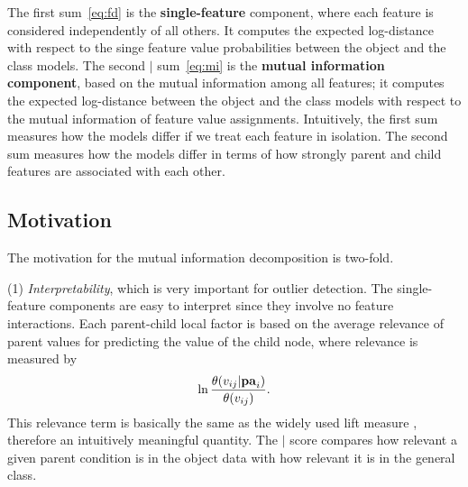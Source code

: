 	
	The first sum~\eqref{eq:fd} is the \textbf{single-feature} component, where each feature is considered independently of all others. It computes the expected log-distance with respect to  the singe feature value probabilities between the object and the class models. 
	The second $\mid$ sum~\eqref{eq:mi} is the \textbf{mutual information component}, based on the mutual information among all features; it computes the expected log-distance between the object and the class models with respect to the mutual information of feature value assignments.
	Intuitively, the first sum measures how the models differ if we treat each feature in isolation. The second sum measures how the models differ in terms of how strongly parent and child features are associated with each other. 
	
	
	\subsection{Motivation} 
	The motivation for the mutual information decomposition is two-fold. 
	
	\noindent
	(1) {\em Interpretability}, which is very important for outlier detection. The single-feature components are easy to interpret since they involve no feature interactions. Each parent-child local factor is based on the average relevance of parent values for predicting the value of the child node, where relevance is measured by $$\ln \frac{\theta(v_{ij}|\mathbf{pa}_{i})}{\theta(v_{ij})}.$$ This relevance term  is basically the same as the widely used lift measure \cite{Tuffery2011}, therefore an intuitively meaningful quantity. The $\mid$ score compares how relevant a given parent condition is in the object data with how relevant it is in the general class. 
	
